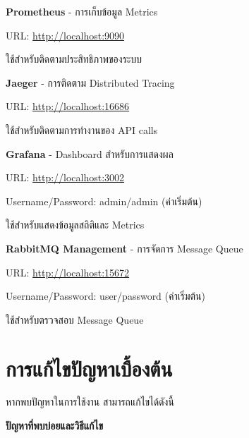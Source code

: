 \begin{mycustomenum2}
    \item \textbf{Prometheus} - การเก็บข้อมูล Metrics
    \begin{mycustomenum2}
        \item URL: \url{http://localhost:9090}
        \item ใช้สำหรับติดตามประสิทธิภาพของระบบ
    \end{mycustomenum2}

    \item \textbf{Jaeger} - การติดตาม Distributed Tracing
    \begin{mycustomenum2}
        \item URL: \url{http://localhost:16686}
        \item ใช้สำหรับติดตามการทำงานของ API calls
    \end{mycustomenum2}

    \item \textbf{Grafana} - Dashboard สำหรับการแสดงผล
    \begin{mycustomenum2}
        \item URL: \url{http://localhost:3002}
        \item Username/Password: admin/admin (ค่าเริ่มต้น)
        \item ใช้สำหรับแสดงข้อมูลสถิติและ Metrics
    \end{mycustomenum2}

    \item \textbf{RabbitMQ Management} - การจัดการ Message Queue
    \begin{mycustomenum2}
        \item URL: \url{http://localhost:15672}
        \item Username/Password: user/password (ค่าเริ่มต้น)
        \item ใช้สำหรับตรวจสอบ Message Queue
    \end{mycustomenum2}
\end{mycustomenum2}

\section{การแก้ไขปัญหาเบื้องต้น}
\hspace*{1.5em}
หากพบปัญหาในการใช้งาน สามารถแก้ไขได้ดังนี้

\vspace{0.5em}
\textbf{ปัญหาที่พบบ่อยและวิธีแก้ไข}
\vspace{0.5em}

